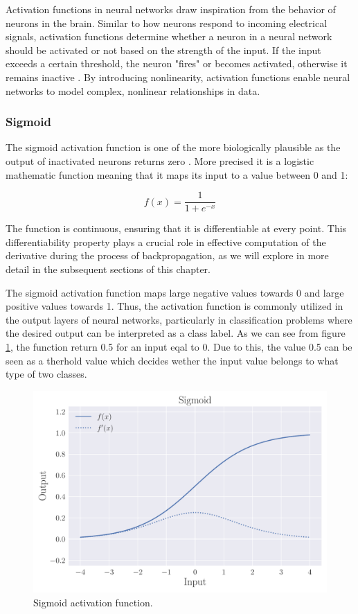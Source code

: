 \documentclass[a4paper, UKenglish, 11pt]{uiomaster}
\begin{document}
Activation functions in neural networks draw inspiration from the behavior of neurons in the brain. Similar to how neurons respond to incoming electrical signals, activation functions determine whether a neuron in a neural network should be activated or not based on the strength of the input. If the input exceeds a certain threshold, the neuron "fires" or becomes activated, otherwise it remains inactive \cite{analyticsvidhya_activationfunctions}. By introducing nonlinearity, activation functions enable neural networks to model complex, nonlinear relationships in data.


\subsubsection{Sigmoid}
The sigmoid activation function is one of the more biologically plausible as the output of inactivated neurons returns zero \cite{Jensen2022}. More precised it is a logistic mathematic function meaning that it maps its input to a value between 0 and 1:

\begin{equation}
  f(x) = \frac{1}{1 + e^{-x}}
\label{eq:Sigmoid}
\end{equation}

The function is continuous, ensuring that it is differentiable at every point. This differentiability property plays a crucial role in effective computation of the derivative during the process of backpropagation, as we will explore in more detail in the subsequent sections of this chapter.

The sigmoid activation function maps large negative values towards 0 and large positive values towards 1. Thus, the activation function is commonly utilized in the output layers of neural networks, particularly in classification problems where the desired output can be interpreted as a class label. As we can see from figure \ref{fig:sigmoid}, the function return 0.5 for an input eqal to 0. Due to this, the value 0.5 can be seen as a therhold value which decides wether the input value belongs to what type of two classes.

\begin{figure}
    \centering
    \includegraphics[width=\linewidth]{figures/Sigmoid.pdf}
    \caption{Sigmoid activation function.}
    \label{fig:sigmoid}
\end{figure}
\end{document}
